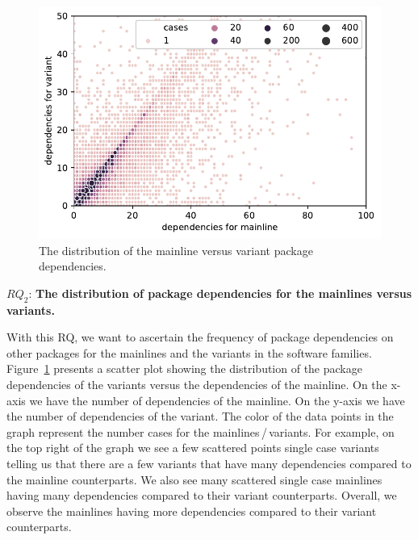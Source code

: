 \begin{figure}[htbp]
\vspace{-.3cm}
   \centering
    \includegraphics[scale=0.6]{figures/benevolj_dependencies.pdf}
    \caption{The distribution of the mainline versus variant package dependencies.}
    \label{fig:dependencies}
\end{figure}


$RQ_2$: \textbf{The distribution of package dependencies for the mainlines versus variants.}

With this RQ, we want to ascertain the frequency of package dependencies on other packages for the mainlines and the variants in the software families. 
Figure~\ref{fig:dependencies} presents a scatter plot showing the distribution of the package dependencies of the variants versus the dependencies of the mainline.
On the x-axis we have the number of dependencies of the mainline. 
On the y-axis we have the number of dependencies of the variant.
The color of the data points in the graph represent the number cases for the mainlines\,/\,variants.
For example, on the top right of the graph we see a few scattered points single case variants telling us that there are a few variants that have many dependencies compared to the mainline counterparts.
We also see many scattered single case mainlines having many dependencies compared to their variant counterparts. 
Overall, we observe the mainlines having more dependencies compared to their variant counterparts.

